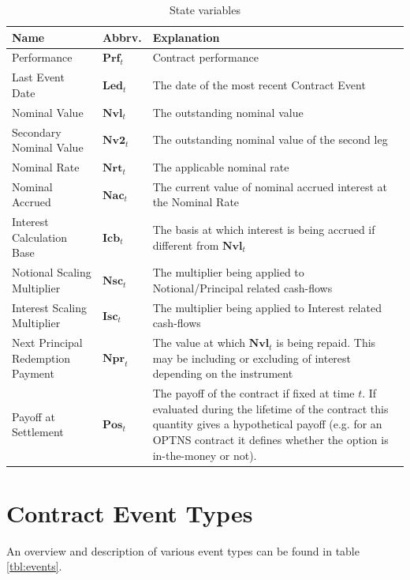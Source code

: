 \documentclass[9pt,oneside]{amsart}
\newcommand{\svar}[2]{\textbf{#1}_{#2}}
\begin{document}
\begin{multicols}{2}
\begin{table}[H]
	\centering
	\begin{tabular}{| p{0.8in}p{0.3in}p{1.8in} |}
	\hline
	\textbf{Name} & \textbf{Abbrv.} & \textbf{Explanation} \\
	\hline
	Performance & $\svar{Prf}{t}$ & Contract performance \\	
	\hline
	Last Event Date & $\svar{Led}{t}$ & The date of the most recent Contract Event \\
	\hline
	Nominal Value & $\svar{Nvl}{t}$ & The outstanding nominal value \\
	\hline
	Secondary Nominal Value & $\svar{Nv2}{t}$ & The outstanding nominal value of the second leg \\
	\hline
	Nominal Rate & $\svar{Nrt}{t}$ & The applicable nominal rate \\
	\hline
	Nominal Accrued & $\svar{Nac}{t}$ & The current value of nominal accrued interest at the Nominal Rate \\
	\hline
	Interest Calculation Base & $\svar{Icb}{t}$ & The basis at which interest is being accrued if different from $\svar{Nvl}{t}$ \\
	\hline
	Notional Scaling Multiplier & $\svar{Nsc}{t}$ & The multiplier being applied to Notional/Principal related
	cash-flows \\
	\hline
	Interest Scaling Multiplier & $\svar{Isc}{t}$ & The multiplier being applied to Interest related cash-flows \\
	\hline
	Next Principal Redemption Payment & $\svar{Npr}{t}$ & The value at which $\svar{Nvl}{t}$ is being repaid. This may be including or excluding of interest depending on the instrument\\
	\hline
	Payoff at Settlement & $\svar{Pos}{t}$ & The payoff of the contract if fixed at time $t$. If evaluated during the lifetime of the contract this quantity gives a hypothetical payoff (e.g. for an OPTNS contract it defines whether the option is in-the-money or not).\\
	\hline
	\end{tabular}
	\caption{State variables}
	\label{tbl:statevars}
\end{table}




\section{Contract Event Types}\label{sec:eventtypes}

An overview and description of various event types can be found in table \ref{tbl:events}. 

\end{multicols}
\end{document}
